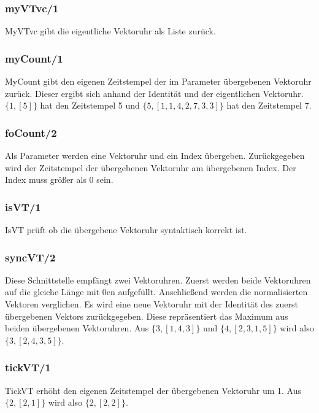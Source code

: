 \subsubsection{myVTvc/1}

MyVTvc gibt die eigentliche Vektoruhr als Liste zurück.

\subsubsection{myCount/1}

MyCount gibt den eigenen Zeitstempel der im Parameter übergebenen Vektoruhr zurück. Dieser ergibt sich anhand der Identität und der eigentlichen Vektoruhr. $\{1, [5]\}$ hat den Zeitstempel 5 und $\{5, [1,1,4,2,7,3,3]\}$ hat den Zeitstempel 7.

\subsubsection{foCount/2}

Als Parameter werden eine Vektoruhr und ein Index übergeben. Zurückgegeben wird der Zeitstempel der übergebenen Vektoruhr am übergebenen Index. Der Index muss größer als 0 sein.

\subsubsection{isVT/1}

IsVT prüft ob die übergebene Vektoruhr syntaktisch korrekt ist.

\subsubsection{syncVT/2}

Diese Schnittstelle empfängt zwei Vektoruhren. Zuerst werden beide Vektoruhren auf die gleiche Länge mit 0en aufgefüllt. Anschließend werden die normalisierten Vektoren verglichen. Es wird eine neue Vektoruhr mit der Identität des zuerst übergebenen Vektors zurückgegeben. Diese repräsentiert das Maximum aus beiden übergebenen Vektoruhren. Aus $\{3, [1,4,3]\}$ und $\{4, [2,3,1,5]\}$ wird also $\{3, [2,4,3,5]\}$. 

\subsubsection{tickVT/1}

TickVT erhöht den eigenen Zeitstempel der übergebenen Vektoruhr um 1. Aus $\{2, [2,1]\}$ wird also $\{2, [2,2]\}$.

